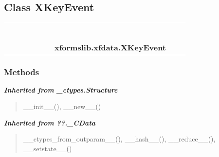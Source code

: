 
\subsection{Class XKeyEvent}

    \label{xformslib:xfdata:XKeyEvent}
\begin{tabular}{cccccccccc}
\multicolumn{2}{r}{\settowidth{\BCL}{object}\multirow{2}{\BCL}{object}}
&&
&&
&&
  \\\cline{3-3}
  &&\multicolumn{1}{c|}{}
&&
&&
&&
  \\
\multicolumn{4}{r}{\settowidth{\BCL}{??.\_CData}\multirow{2}{\BCL}{??.\_CData}}
&&
&&
  \\\cline{5-5}
  &&&&\multicolumn{1}{c|}{}
&&
&&
  \\
\multicolumn{6}{r}{\settowidth{\BCL}{\_ctypes.Structure}\multirow{2}{\BCL}{\_ctypes.Structure}}
&&
  \\\cline{7-7}
  &&&&&&\multicolumn{1}{c|}{}
&&
  \\
&&&&&&\multicolumn{2}{l}{\textbf{xformslib.xfdata.XKeyEvent}}
\end{tabular}



  \subsubsection{Methods}


\large{\textbf{\textit{Inherited from \_ctypes.Structure}}}

\begin{quote}
\_\_init\_\_(), \_\_new\_\_()
\end{quote}

\large{\textbf{\textit{Inherited from ??.\_CData}}}

\begin{quote}
\_\_ctypes\_from\_outparam\_\_(), \_\_hash\_\_(), \_\_reduce\_\_(), \_\_setstate\_\_()
\end{quote}

